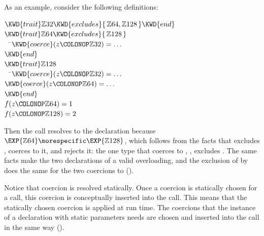 As an example, consider the following definitions:
%
\begin{Fortress}
\(\KWD{trait} \mathbb{Z}32 \KWD{excludes} \{\,\mathbb{Z}64, \mathbb{Z}128\,\} \KWD{end}\)\\
\(\KWD{trait} \mathbb{Z}64 \KWD{excludes} \{\,\mathbb{Z}128\,\}\)\\
{\tt~~}\pushtabs\=\+\(  \KWD{coerce}(z\COLONOP\mathbb{Z}32) = \ldots\)\-\\\poptabs
\(\KWD{end}\)\\
\(\KWD{trait} \mathbb{Z}128\)\\
{\tt~~}\pushtabs\=\+\(  \KWD{coerce}(z\COLONOP\mathbb{Z}32) = \ldots\)\\
\(  \KWD{coerce}(z\COLONOP\mathbb{Z}64) = \ldots\)\-\\\poptabs
\(\KWD{end}\)\\[4pt]
\(f(z\COLONOP\mathbb{Z}64) = 1\)\\
\(f(z\COLONOP\mathbb{Z}128) = 2\)
\end{Fortress}
Then the call  resolves to the
declaration  because $\EXP{\mathbb{Z}64}
\morespecific \EXP{\mathbb{Z}128}$, which follows from the facts that
 excludes , coerces to it, and rejects it:
the one type that coerces to , , excludes
.
The same facts make the two declarations of  a valid overloading, and the
exclusion of  by  does the same for the two
coercions to  ().

Notice that coercion is resolved statically.  Once a coercion is
statically chosen for a call, this coercion is conceptually inserted
into the call.
This means that the statically chosen coercion is applied at run time.
The coercions that the instance of a declaration with static parameters needs
are chosen and inserted into the call in the same way
().

